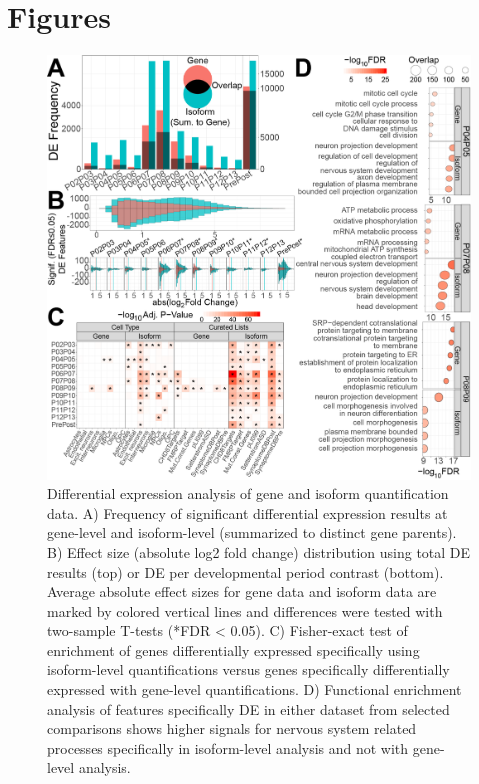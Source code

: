 \documentclass[12pt,chapterheads,final]{ucsd}
\begin{document}
\chapter{Figures}
\begin{figure}[h]
  \centering
  \includegraphics[width=\textwidth]{figure1}
  \caption[Differential expression analysis of gene and isoform quantification data.]
{Differential expression analysis of gene and isoform quantification data. A) Frequency of significant differential expression results at gene-level and isoform-level (summarized to distinct gene parents). B) Effect size (absolute log2 fold change) distribution using total DE results (top) or DE per developmental period contrast (bottom). Average absolute effect sizes for gene data and isoform data are marked by colored vertical lines and differences were tested with two-sample T-tests (*FDR < 0.05). C) Fisher-exact test of enrichment of genes differentially expressed specifically using isoform-level quantifications versus genes specifically differentially expressed with gene-level quantifications. D) Functional enrichment analysis of features specifically DE in either dataset from selected comparisons shows higher signals for nervous system related processes specifically in isoform-level analysis and not with gene-level analysis.}
\end{figure}
\end{document}
